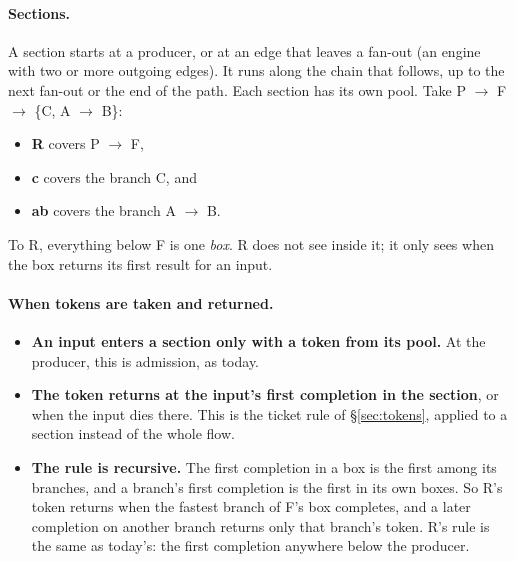 \documentclass[11pt]{article}
\begin{document}
\paragraph{Sections.} A section starts at a producer, or at an edge that
leaves a fan-out (an engine with two or more outgoing edges). It runs along
the chain that follows, up to the next fan-out or the end of the path. Each
section has its own pool. Take P $\to$ F $\to$ \{C, A $\to$ B\}:
\begin{itemize}[nosep]
  \item \textbf{R} covers P $\to$ F,
  \item \textbf{c} covers the branch C, and
  \item \textbf{ab} covers the branch A $\to$ B.
\end{itemize}
To R, everything below F is one \emph{box}. R does not see inside it; it
only sees when the box returns its first result for an input.

\paragraph{When tokens are taken and returned.}
\begin{itemize}[nosep]
  \item \textbf{An input enters a section only with a token from its pool.}
        At the producer, this is admission, as today.
  \item \textbf{The token returns at the input's first completion in the
        section}, or when the input dies there. This is the ticket rule of
        \S\ref{sec:tokens}, applied to a section instead of the whole flow.
  \item \textbf{The rule is recursive.} The first completion in a box is the
        first among its branches, and a branch's first completion is the
        first in its own boxes. So R's token returns when the fastest branch
        of F's box completes, and a later completion on another branch
        returns only that branch's token. R's rule is the same as today's:
        the first completion anywhere below the producer.
\end{itemize}
\end{document}
